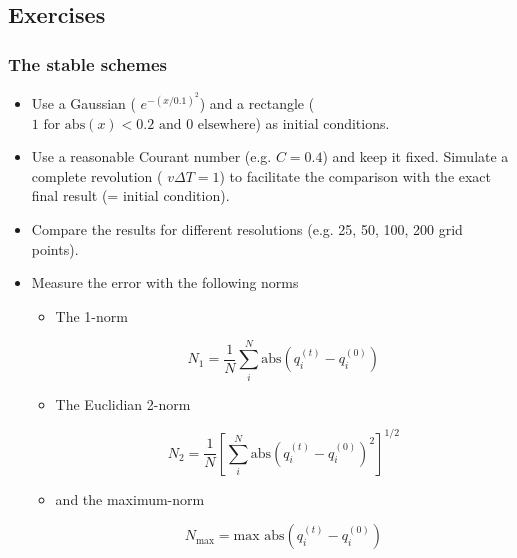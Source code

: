 \subsection{Exercises}

\subsubsection{The stable schemes}

\begin{itemize}

\item Use a Gaussian ( $e^{-\left(x/0.1\right)^2}$) and a rectangle ( $1 \mbox{ for abs}(x) < 0.2 \mbox{ and } 0 \mbox{ elsewhere}$) as initial conditions. 

\item  Use a reasonable Courant number (e.g. $C=0.4$) and keep it fixed. Simulate a complete 
revolution ( $v\Delta T    = 1$) to facilitate the comparison with the exact final result (= initial condition).

\item  Compare the results for different resolutions (e.g. 25, 50, 100, 200 grid points).

\item  Measure the error with the following norms

\begin{itemize}
  
\item The 1-norm

\begin{equation}
N_1 = \frac{1}{N} \sum_i^N \mbox{abs}\left(q_i^{(t)} - q_i^{(0)}\right)
\end{equation}

\item The Euclidian 2-norm 

\begin{equation}
N_2 = \frac{1}{N} \left[\sum_i^N \mbox{abs}\left(q_i^{(t)} - q_i^{(0)}\right)^2\right]^{1/2}
\end{equation}

\item and the maximum-norm 


\begin{equation}
N_\mathrm{max} = \mbox{max abs} \left(q_i^{(t)} - q_i^{(0)}\right)
\end{equation}

\end{itemize}

\end{itemize}
